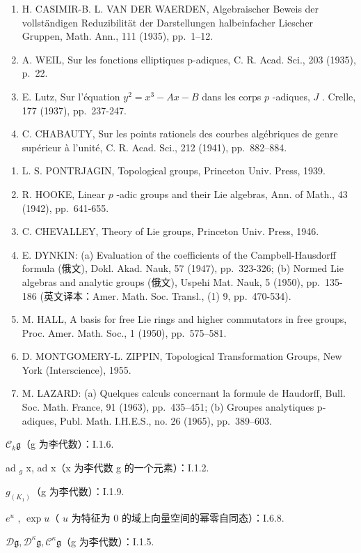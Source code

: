 \begin{enumerate}
\item
  H. CASIMIR-B. L. VAN DER WAERDEN, Algebraischer Beweis der vollständigen Reduzibilität der Darstellungen halbeinfacher Liescher Gruppen, Math. Ann., 111 (1935), pp.~1--12.
\item
  A. WEIL, Sur les fonctions elliptiques p-adiques, C. R. Acad. Sci., 203 (1935), p.~22.
\item
  E. Lutz, Sur l'équation \(y^{2} = x^{3} - Ax - B\) dans les corps \(p\) -adiques, \(J\) . Crelle, 177 (1937), pp.~237-247.
\item
  C. CHABAUTY, Sur les points rationels des courbes algébriques de genre supérieur à l'unité, C. R. Acad. Sci., 212 (1941), pp.~882--884.
\end{enumerate}

\begin{enumerate}
\def\labelenumi{\arabic{enumi}.}
\setcounter{enumi}{35}
\item
  L. S. PONTRJAGIN, Topological groups, Princeton Univ. Press, 1939.
\item
  R. HOOKE, Linear \(p\) -adic groups and their Lie algebras, Ann. of Math., 43 (1942), pp.~641-655.
\item
  C. CHEVALLEY, Theory of Lie groups, Princeton Univ. Press, 1946.
\item
  E. DYNKIN: (a) Evaluation of the coefficients of the Campbell-Hausdorff formula (俄文), Dokl. Akad. Nauk, 57 (1947), pp.~323-326; (b) Normed Lie algebras and analytic groups (俄文), Uspehi Mat. Nauk, 5 (1950), pp.~135-186 (英文译本：Amer. Math. Soc. Transl., (1) 9, pp.~470-534).
\item
  M. HALL, A basis for free Lie rings and higher commutators in free groups, Proc. Amer. Math. Soc., 1 (1950), pp.~575--581.
\item
  D. MONTGOMERY-L. ZIPPIN, Topological Transformation Groups, New York (Interscience), 1955.
\item
  M. LAZARD: (a) Quelques calculs concernant la formule de Haudorff, Bull. Soc. Math. France, 91 (1963), pp.~435--451; (b) Groupes analytiques p-adiques, Publ. Math. I.H.E.S., no. 26 (1965), pp.~389--603.
\end{enumerate}

\(\mathcal{C}_k\mathfrak{g}\)（g 为李代数）：I.1.6.

ad \(_{g}\) x, ad x（x 为李代数 g 的一个元素）：I.1.2.

\(g_{(K_{1})}\)（g 为李代数）：I.1.9.

\(e^u\) , \(\exp u\)（ \(u\) 为特征为 0 的域上向量空间的幂零自同态）：I.6.8.

\(\mathcal{D}\mathfrak{g}, \mathcal{D}^{\kappa}\mathfrak{g}, \mathcal{C}^{\kappa}\mathfrak{g}\)（g 为李代数）：I.1.5.
